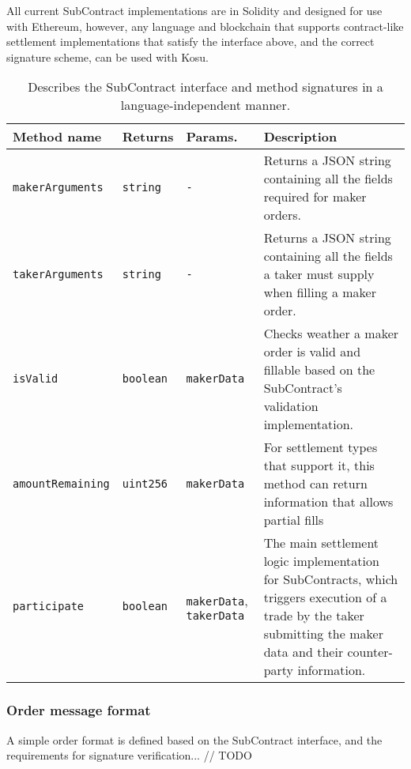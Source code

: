 \documentclass[9pt]{article}
\begin{document}
\noindent All current SubContract implementations are in Solidity and designed for use with Ethereum, however, any language and blockchain that supports contract-like settlement implementations that satisfy the interface above, and the correct signature scheme, can be used with Kosu.
\medskip

\bgroup
\def\arraystretch{1.2}
\begin{table}[H]
\centering
\label{table:table1}
\begin{tabularx}{1\textwidth}{|l|l|X|p{8cm}|}
\hline
\textbf{Method name} & \textbf{Returns} & \textbf{Params.} & \textbf{Description} \\ 
\hline
\texttt{makerArguments} & \texttt{string} & \texttt{-} & Returns a JSON string containing all the fields required for maker orders. \\
\hline
\texttt{takerArguments} & \texttt{string} & \texttt{-} & Returns a JSON string containing all the fields a taker must supply when filling a maker order. \\
\hline
\texttt{isValid} & \texttt{boolean} & \texttt{makerData} & Checks weather a maker order is valid and fillable based on the SubContract's validation implementation. \\
\hline
\texttt{amountRemaining} & \texttt{uint256} & \texttt{makerData} & For settlement types that support it, this method can return information that allows partial fills \\
\hline
\texttt{participate} & \texttt{boolean} & \texttt{makerData}, \texttt{takerData} & The main settlement logic implementation for SubContracts, which triggers execution of a trade by the taker submitting the maker data and their counter-party information. \\
\hline
\end{tabularx}
\caption{Describes the SubContract interface and method signatures in a language-independent manner.} 
\end{table}
\egroup

\subsubsection{Order message format}\label{order-message-format}

\noindent A simple order format is defined based on the SubContract interface, and the requirements for signature verification... // TODO
\medskip
\end{document}
